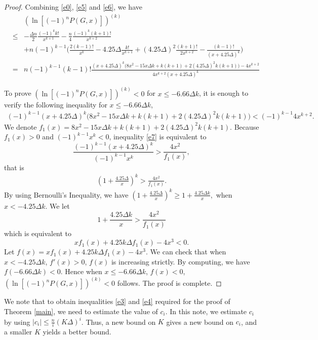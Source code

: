 \documentclass[12pt]{article}
\theoremstyle{definition}
\begin{document}
\begin{proof}
Combining \eqref{e0}, \eqref{e5} and \eqref{e6}, we have
\begin{eqnarray*}&&(\ln[(-1)^n P(G, x)])^{(k)}\\
&\leq&-\frac{\Delta n}{2} \frac{(-1)^{k}k!}{x^{k+1}} - \frac{n}{4} \frac{(-1)^{k} (k+1)!}{x^{k+2}} \\
&&+n(-1)^{k-1}\Big(\frac{2(k-1)!}{x^{k}}-4.25\Delta \frac{k!}{x^{k+1}} + (4.25\Delta)^{2}\frac{(k+1)!}{2x^{k+2}}-\frac{(k-1)!}{(x+4.25\Delta)^{k}}\Big)\\
&=&n(-1)^{k-1}(k-1)!\frac{(x+4.25\Delta)^{k}\big(8x^2-15x\Delta k+k(k+1)+2(4.25\Delta)^2k(k+1)\big)-4x^{k+2}}{4x^{k+2}(x+4.25\Delta)^{k}}
\end{eqnarray*}

To prove $(\ln[(-1)^n P(G, x)])^{(k)}<0$ for $x\leq -6.66\Delta k$, it is enough to verify the following inequality for $x\leq -6.66\Delta k$,
\begin{eqnarray}\label{e7}(-1)^{k-1}(x+4.25\Delta)^{k}\big(8x^2-15x\Delta k+k(k+1)+2(4.25\Delta)^2k(k+1)\big)<(-1)^{k-1}4x^{k+2}.\end{eqnarray}
We denote $f_1(x)=8x^2-15x\Delta k+k(k+1)+2(4.25\Delta)^2k(k+1)$. Because $f_1(x)>0$ and $(-1)^{k-1}x^{k}<0$,
inequality \eqref{e7} is equivalent to
$$\frac{(-1)^{k-1}(x+4.25\Delta)^{k}}{(-1)^{k-1}x^{k}}>\frac{4x^2}{f_1(x)},$$ that is
\begin{eqnarray*}\label{e8}(1+\frac{4.25\Delta}{x})^{k}>\frac{4x^2}{f_1(x)}.\end{eqnarray*}
By using Bernoulli's Inequality, we have $(1+\frac{4.25\Delta}{x})^{k}\geq 1+\frac{4.25\Delta k}{x},$  when $x<-4.25\Delta k$.
We let
$$1+\frac{4.25\Delta k}{x}> \frac{4x^2}{f_1(x)}$$ which is equivalent to $$xf_1(x)+4.25k\Delta f_1(x)-4x^3< 0.$$
Let $f(x)=xf_1(x)+4.25k\Delta f_1(x)-4x^3.$
We can check that when $x<-4.25\Delta k$, $f'(x)>0$, $f(x)$ is increasing strictly. By computing, we have $f(-6.66\Delta k)<0$.
Hence when $x\leq -6.66\Delta k$, $f(x)<0$, $(\ln[(-1)^n P(G, x)])^{(k)}<0$ follows.  The proof is complete.
\end{proof}

We note that to obtain inequalities \eqref{e3} and \eqref{e4} required for the proof of Theorem \ref{main}, we need to estimate the value of $c_i$.
In this note, we estimate $c_i$ by using $|c_i| \leq \frac{n}{i}(K\Delta)^i$. Thus, a new bound on $K$ gives a new bound on $c_i$, and a smaller
$K$ yields a better bound.


\end{document}
